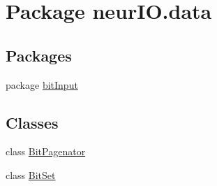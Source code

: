 \hypertarget{namespaceneur_i_o_1_1data}{}\section{Package neur\+I\+O.\+data}
\label{namespaceneur_i_o_1_1data}
\subsection*{Packages}
\begin{DoxyCompactItemize}
\item 
package \hyperlink{namespaceneur_i_o_1_1data_1_1bit_input}{bit\+Input}
\end{DoxyCompactItemize}
\subsection*{Classes}
\begin{DoxyCompactItemize}
\item 
class \hyperlink{classneur_i_o_1_1data_1_1_bit_pagenator}{Bit\+Pagenator}
\item 
class \hyperlink{classneur_i_o_1_1data_1_1_bit_set}{Bit\+Set}
\end{DoxyCompactItemize}
